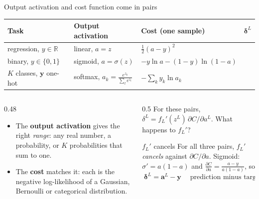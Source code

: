 \documentclass[10pt,aspectratio=169]{beamer}
\begin{document}
\begin{frame}{Output activation and cost function come in pairs}
\begin{center}
\setlength{\tabcolsep}{6pt}
\begin{tabular}{@{}llll@{}}
\toprule
Task & Output activation & Cost (one sample) & $\bm{\delta}^{L}$\\
\midrule
regression, $y\in\mathbb{R}$ & linear, $a=z$ & $\tfrac12(a-y)^{2}$ & \uncover<2->{$a-y$}\\[2pt]
binary, $y\in\{0,1\}$ & sigmoid, $a=\sigma(z)$ & $-y\ln a-(1-y)\ln(1-a)$ & \uncover<2->{$a-y$}\\[2pt]
$K$ classes, $\bm{y}$ one-hot & softmax, $a_k=\frac{e^{z_k}}{\sum_le^{z_l}}$ & $-\sum_ky_k\ln a_k$ & \uncover<2->{$\bm{a}-\bm{y}$}\\
\bottomrule
\end{tabular}
\end{center}
\begin{columns}[T]
\begin{column}{0.48\textwidth}
\small
\begin{itemize}
  \item The \textbf{output activation} gives the right \emph{range}: any
        real number, a probability, or $K$ probabilities that sum to one.
  \item The \textbf{cost} matches it: each is the negative log-likelihood of
        a Gaussian, Bernoulli or categorical distribution.
\end{itemize}
\vspace{4pt}
\end{column}
\begin{column}{0.5\textwidth}
\small
For these pairs, $\delta^{L}=f_{L}'(z^{L})\,\partial C/\partial a^{L}$.
What happens to $f_{L}'$?
\pause
\begin{block}{$f_L'$ cancels}
For all three pairs, $f_{L}'$ \emph{cancels} against
$\partial C/\partial a$.  Sigmoid: $\sigma'=a(1-a)$ and
$\frac{\partial C}{\partial a}=\frac{a-y}{a(1-a)}$, so
\[
  \boxed{\;\bm{\delta}^{L}=\bm{a}^{L}-\bm{y}\;}\quad
  \text{prediction minus target.}
\]
\end{block}
\end{column}
\end{columns}
\end{frame}
\end{document}
